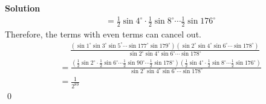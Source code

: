 \documentclass{article}
\newenvironment{solution}{\begin{trivlist}\item[]{\bf Solution}}{\qed \end{trivlist}}
\begin{document}
\begin{solution}
\begin{align*}
    &= \frac{1}{2}\sin 4^\circ \cdot \frac{1}{2}\sin 8^\circ \cdots \frac{1}{2} \sin 176^\circ
\end{align*}
Therefore, the terms with even terms can cancel out.
\begin{align*}
    &\quad \ \frac{(\sin 1^\circ \sin 3^\circ \sin 5^\circ \cdots \sin 177^\circ \sin 179^\circ)(\sin 2^\circ \sin 4^\circ \sin 6^\circ \cdots \sin 178^\circ)}{\sin 2^\circ \sin 4^\circ \sin 6^\circ \cdots \sin 178^\circ} \\[0.5em]
    &= \frac{(\frac{1}{2}\sin 2^\circ \cdot \frac{1}{2}\sin 6^\circ \cdots \frac{1}{2} \sin 90^\circ \cdots \frac{1}{2} \sin 178^\circ) (\frac{1}{2}\sin 4^\circ \cdot \frac{1}{2}\sin 8^\circ \cdots \frac{1}{2} \sin 176^\circ)}{\sin 2^\circ \sin 4^\circ \sin 6^\circ \cdots \sin 178^\circ} \\
    &= \boxed{\frac{1}{2^{89}}}
\end{align*}
\end{solution}
\end{document}
